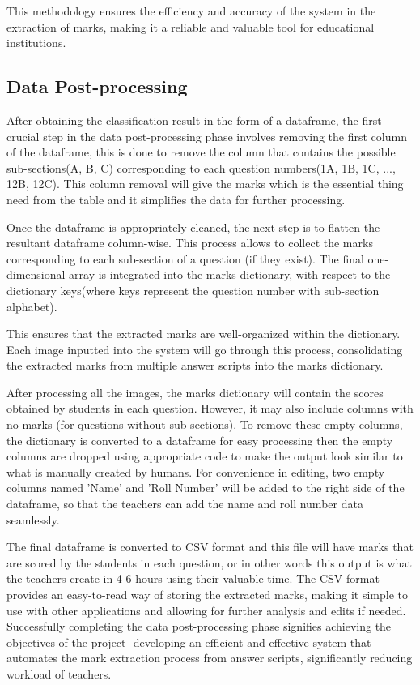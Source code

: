 \noindent This methodology ensures the efficiency and accuracy of the system in the extraction of marks, making it a reliable and valuable tool for educational institutions.

\subsection{Data Post-processing}

\noindent After obtaining the classification result in the form of a dataframe, the first crucial step in the data post-processing phase involves removing the first column of the dataframe, this is done to remove the column that contains the possible sub-sections(A, B, C) corresponding to each question numbers(1A, 1B, 1C, ..., 12B, 12C). This column removal will give the marks which is the essential thing need from the table and it simplifies the data for further processing.

\noindent Once the dataframe is appropriately cleaned, the next step is to flatten the resultant dataframe column-wise. This process allows to collect the marks corresponding to each sub-section of a question (if they exist). The final one-dimensional array is integrated into the marks dictionary, with respect to the dictionary keys(where keys represent the question number with sub-section alphabet).

\clearpage

\noindent This ensures that the extracted marks are well-organized within the dictionary. Each image inputted into the system will go through this process, consolidating the extracted marks from multiple answer scripts into the marks dictionary.

\noindent After processing all the images, the marks dictionary will contain the scores obtained by students in each question. However, it may also include columns with no marks (for questions without sub-sections). To remove these empty columns, the dictionary is converted to a dataframe for easy processing then the empty columns are dropped using appropriate code to make the output look similar to what is manually created by humans. For convenience in editing, two empty columns named 'Name' and 'Roll Number' will be added to the right side of the dataframe, so that the teachers can add the name and roll number data seamlessly.

\noindent The final dataframe is converted to CSV format and this file will have marks that are scored by the students in each question, or in other words this output is what the teachers create in 4-6 hours using their valuable time. The CSV format provides an easy-to-read way of storing the extracted marks, making it simple to use with other applications and allowing for further analysis and edits if needed. Successfully completing the data post-processing phase signifies achieving the objectives of the project- developing an efficient and effective system that automates the mark extraction process from answer scripts, significantly reducing workload of teachers.

